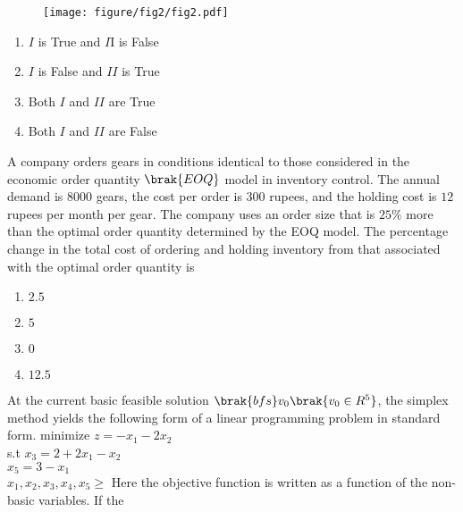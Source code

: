 \begin{figure}[h!]
         \centering
        \texttt{[image: figure/fig2/fig2.pdf]}
		\caption{}
        \label{stemplot}

\end{figure}



\begin{enumerate}
    \item $I$ is True and $I$I is False\\
    \item $I$ is False and $II$ is True\\
    \item Both $I$ and $II$ are True\\
     \item Both $I$ and $II$ are False\\
\end{enumerate}
\item A company orders gears in conditions identical to those considered in the economic
order quantity $\brak{EOQ}$ model in inventory control. The annual demand is $8000$ gears,
the cost per order is $300$ rupees, and the holding cost is $12$ rupees per month per gear.
The company uses an order size that is $25\%$ more than the optimal order quantity
determined by the EOQ model. The percentage change in the total cost of ordering
and holding inventory from that associated with the optimal order quantity is\\
\begin{enumerate}
\item $2.5$\\
\item $5$\\
\item $0$\\
\item $12.5$\\
\end{enumerate}
\item At the current basic feasible solution $\brak{bfs} v_{0} \brak{v_{0} \in R^{5}}$, the simplex method yields the following form of a linear programming problem in standard form.
minimize $z=-x_{1}-2x_{2}$\\
s.t      $x_{3}=2+2x_{1}-x_{2}$\\
         $x_{5}=3-x_{1}$\\
         $x_{1},x_{2},x_{3},x_{4},x_{5} \geq$
Here the objective function is written as a function of the non-basic variables. If the
